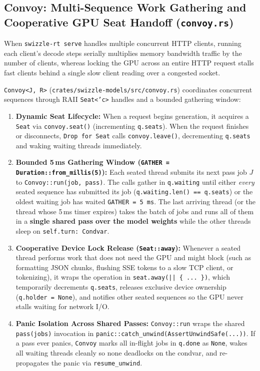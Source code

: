\documentclass[10pt,a4paper]{article}
\theoremstyle{swzstyle}
\newcommand{\code}[1]{\texttt{#1}}
\begin{document}
\subsection{Convoy: Multi-Sequence Work Gathering and Cooperative GPU Seat Handoff (\texttt{convoy.rs})}

When \code{swizzle-rt serve} handles multiple concurrent HTTP clients, running each client's decode steps serially multiplies memory bandwidth traffic by the number of clients, whereas locking the GPU across an entire HTTP request stalls fast clients behind a single slow client reading over a congested socket.

\code{Convoy<J, R>} (\code{crates/swizzle-models/src/convoy.rs}) coordinates concurrent sequences through RAII \code{Seat<'c>} handles and a bounded gathering window:
\begin{enumerate}
  \item \textbf{Dynamic Seat Lifecycle:} When a request begins generation, it acquires a \code{Seat} via \code{convoy.seat()} (incrementing \code{q.seats}). When the request finishes or disconnects, \code{Drop for Seat} calls \code{convoy.leave()}, decrementing \code{q.seats} and waking waiting threads immediately.
  \item \textbf{Bounded 5\,ms Gathering Window (\code{GATHER = Duration::from\_millis(5)}):} Each seated thread submits its next pass job $J$ to \code{Convoy::run(job, pass)}. The calls gather in \code{q.waiting} until either \emph{every} seated sequence has submitted its job (\code{q.waiting.len() == q.seats}) or the oldest waiting job has waited \code{GATHER = 5\,ms}. The last arriving thread (or the thread whose 5\,ms timer expires) takes the batch of jobs and runs all of them in a \textbf{single shared pass over the model weights} while the other threads sleep on \code{self.turn: Condvar}.
  \item \textbf{Cooperative Device Lock Release (\code{Seat::away}):} Whenever a seated thread performs work that does not need the GPU and might block (such as formatting JSON chunks, flushing SSE tokens to a slow TCP client, or tokenizing), it wraps the operation in \code{seat.away(|| \{ ... \})}, which temporarily decrements \code{q.seats}, releases exclusive device ownership (\code{q.holder = None}), and notifies other seated sequences so the GPU never stalls waiting for network I/O.
  \item \textbf{Panic Isolation Across Shared Passes:} \code{Convoy::run} wraps the shared \code{pass(jobs)} invocation in \code{panic::catch\_unwind(AssertUnwindSafe(...))}. If a pass ever panics, \code{Convoy} marks all in-flight jobs in \code{q.done} as \code{None}, wakes all waiting threads cleanly so none deadlocks on the condvar, and re-propagates the panic via \code{resume\_unwind}.
\end{enumerate}
\end{document}
